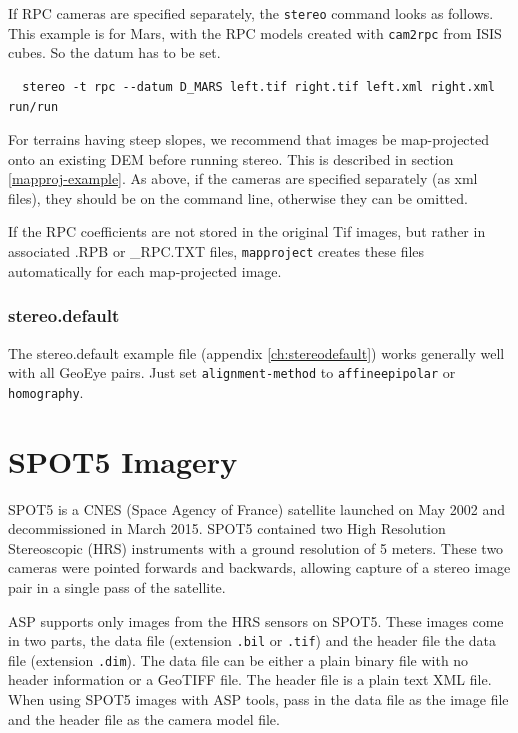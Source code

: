 If RPC cameras are specified separately, the \texttt{stereo} command
looks as follows. This example is for Mars, with the RPC models created
with \texttt{cam2rpc} from ISIS cubes.  So the datum has to be set.

\begin{verbatim}
  stereo -t rpc --datum D_MARS left.tif right.tif left.xml right.xml run/run
\end{verbatim}

For terrains having steep slopes, we recommend that images be
map-projected onto an existing DEM before running stereo. This is
described in section \ref{mapproj-example}. As above, if the cameras
are specified separately (as xml files), they should be on the command line,
otherwise they can be omitted.


If the RPC coefficients are
not stored in the original Tif images, but rather in associated .RPB or
\_RPC.TXT files, \texttt{mapproject} creates
these files automatically for each map-projected image.

\subsubsection*{stereo.default}

The stereo.default example file (appendix \ref{ch:stereodefault})
works generally well with all GeoEye pairs. Just set
\texttt{alignment-method} to \texttt{affineepipolar} or
\texttt{homography}.


\section{SPOT5 Imagery}
\label{sec:spot5}

SPOT5 is a CNES (Space Agency of France) satellite launched on May 2002 and 
decommissioned in March 2015.  SPOT5 contained two High Resolution Stereoscopic 
(HRS) instruments with a ground resolution of 5 meters.  These two cameras were
pointed forwards and backwards, allowing capture of a stereo image pair in
a single pass of the satellite.

ASP supports only images from the HRS sensors on SPOT5.  These images come in
two parts, the data file (extension \texttt{.bil} or \texttt{.tif}) and the header file
the data file (extension \texttt{.dim}).  The data file can be either a plain 
binary file with no header information or a GeoTIFF file.  The header file is a 
plain text XML file.  When using SPOT5 images with ASP tools, pass in the data file
as the image file and the header file as the camera model file.

